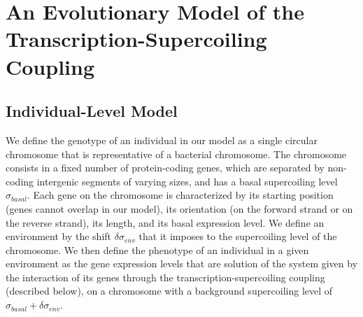 \section{An Evolutionary Model of the Transcription-Supercoiling Coupling}
\label{sec:ploscb:model}

\subsection{Individual-Level Model}
\label{sec:ploscb:indiv_model}

We define the genotype of an individual in our model as a single circular chromosome that is representative of a bacterial chromosome.
The chromosome consists in a fixed number of protein-coding genes, which are separated by non-coding intergenic segments of varying sizes, and has a basal supercoiling level $\sigma_{basal}$.
Each gene on the chromosome is characterized by its starting position (genes cannot overlap in our model), its orientation (on the forward strand or on the reverse strand), its length, and its basal expression level.
We define an environment by the shift $\delta\sigma_{env}$ that it imposes to the supercoiling level of the chromosome.
We then define the phenotype of an individual in a given environment as the gene expression levels that are solution of the system given by the interaction of its genes through the transcription-supercoiling coupling (described below), on a chromosome with a background supercoiling level of $\sigma_{basal} + \delta\sigma_{env}$.

